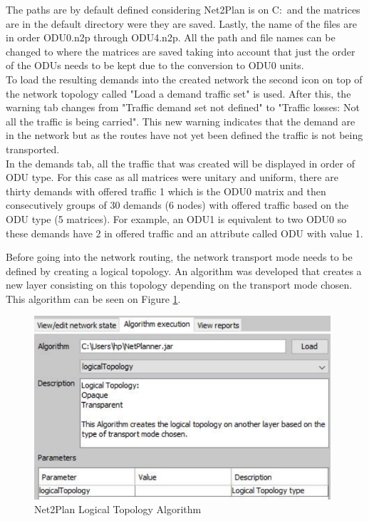 	The paths are by default defined considering Net2Plan is on C:\ and the matrices are in the default directory were they are saved. Lastly, the name of the files are in order ODU0.n2p through ODU4.n2p. All the path and file names can be changed to where the matrices are saved taking into account that just the order of the ODUs needs to be kept due to the conversion to ODU0 units.\\
	
	To load the resulting demands into the created network the second icon on top of the network topology called "Load a demand traffic set" is used. After this, the warning tab changes from "Traffic demand set not defined" to "Traffic losses: Not all the traffic is being carried". This new warning indicates that the demand are in the network but as the routes have not yet been defined the traffic is not being transported.\\
	
	In the demands tab, all the traffic that was created will be displayed in order of ODU type. For this case as all matrices were unitary and uniform, there are thirty demands with offered traffic 1 which is the ODU0 matrix and then consecutively groups of 30 demands (6 nodes) with offered traffic based on the ODU type (5 matrices). For example, an ODU1 is equivalent to two ODU0 so these demands have 2 in offered traffic and an attribute called ODU with value 1.\\
	
	\pagebreak
	
	Before going into the network routing, the network transport mode needs to be defined by creating a logical topology. An algorithm was developed that creates a new layer consisting on this topology depending on the transport mode chosen. This algorithm can be seen on Figure \ref{Logical_Topology_Algorithm}.\\
	
	
	\begin{figure}[h!]
		\centering
		\includegraphics[width = 11cm]{Logical_Topology_Algorithm.pdf}
		\caption{Net2Plan Logical Topology Algorithm}
		\label{Logical_Topology_Algorithm}
	\end{figure}	
	

